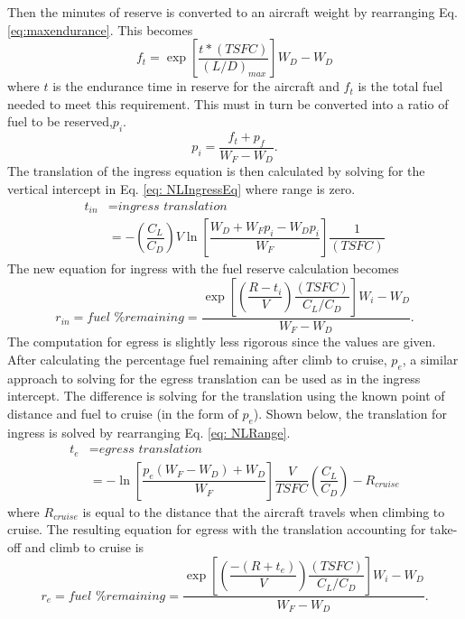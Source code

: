 Then the minutes of reserve is converted to an aircraft weight by rearranging Eq. \ref{eq:maxendurance}. This becomes
\begin{equation*}
    f_t = \exp\left[\dfrac{t*(TSFC)}{(L/D)_{max}}\right]W_D-W_D
\end{equation*}
where $t$ is the endurance time in reserve for the aircraft and $f_t$ is the total fuel needed to meet this requirement. This must in turn be converted into a ratio of fuel to be reserved,$p_i$.
\begin{equation*}
    p_i = \dfrac{f_t + p_f}{W_F-W_D}.
\end{equation*}
The translation of the ingress equation is then calculated by solving for the vertical intercept in Eq. \ref{eq: NLIngressEq} where range is zero.
\begin{align*}
    t_{in}&= \textit{ingress translation} \\ &=-\left(\dfrac{C_L}{C_D}\right)V\ln\left[\dfrac{W_D+W_Fp_i- W_Dp_i}{W_F}\right]\dfrac{1}{(TSFC)}
\end{align*}
The new equation for ingress with the fuel reserve calculation becomes
\begin{equation}
    r_{in} = \textit{fuel \% remaining} =\dfrac{\exp\left[\left(\dfrac{R-t_i}{V}\right)\dfrac{(TSFC)}{C_L/C_D}\right]W_i-W_D}{W_F - W_D}.
    \label{eq: NLIngressFull}
\end{equation}
The computation for egress is slightly less rigorous since the values are given. After calculating the percentage fuel remaining after climb to cruise, $p_e$, a similar approach to solving for the egress translation can be used as in the ingress intercept. The difference is solving for the translation using the known point of distance and fuel to cruise (in the form of $p_e$). Shown below, the translation for ingress is solved by rearranging Eq. \ref{eq: NLRange}. 
\begin{align*}
    t_e &= \textit{egress translation}\\
    &=-\ln\left[\dfrac{p_e(W_F-W_D)+W_D}{W_F}\right]\dfrac{V}{TSFC}\left(\dfrac{C_L}{C_D}\right)-R_{cruise}
\end{align*}
where $R_{cruise}$ is equal to the distance that the aircraft travels when climbing to cruise. The resulting equation for egress with the translation accounting for take-off and climb to cruise is 
\begin{equation}
    r_e = \textit{fuel \% remaining} = \dfrac{\exp\left[\left(\dfrac{-(R+t_e)}{V}\right)\dfrac{(TSFC)}{C_L/C_D}\right]W_i-W_D}{W_F - W_D}.
    \label{eq: NLEgressEqFull}
\end{equation}
